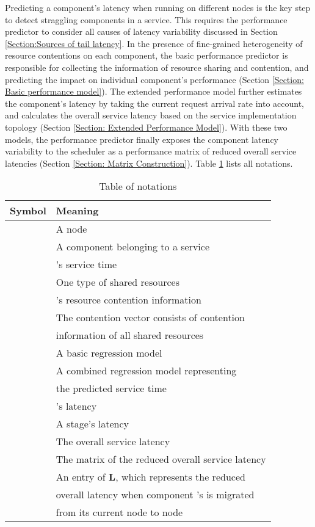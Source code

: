 \documentclass[10pt, conference, compsocconf]{IEEEtran}
\begin{document}
Predicting a component's latency when running on different nodes is the key step to detect straggling components in a service. This requires the performance predictor to consider all causes of latency variability discussed in Section \ref{Section:Sources of tail latency}. In the presence of fine-grained heterogeneity of resource contentions on each component, the basic performance predictor is responsible for collecting the information of resource sharing and contention, and predicting the impact on individual component's performance (Section \ref{Section: Basic performance model}). The extended performance model further estimates the component's latency by taking the current request arrival rate into account, and calculates the overall service latency based on the service implementation topology (Section \ref{Section: Extended Performance Model}). With these two models, the performance predictor finally exposes the component latency variability to the scheduler as a performance matrix of reduced overall service latencies (Section \ref{Section: Matrix Construction}). Table \ref{table: Table of notations} lists all notations.

\begin{table}[h!]
  \caption{Table of notations}
  \centering
  \begin{tabular}{|l|l|}
    \hline
    \textbf{Symbol} & \textbf{Meaning} \\
    \hline
     & A node \\
    \hline
     & A component belonging to a service\\
    \hline
     & 's service time \\
    \hline
     & One type of shared resources \\
    \hline
     & 's resource contention information \\
    \hline
     & The contention vector consists of contention \\
    &  information of all shared resources\\
    \hline
     & A basic regression model \\
    \hline
     & A combined regression model representing\\
    &the predicted service time\\
    \hline
     & 's latency \\
\hline
     & A stage's latency \\
    \hline
     & The overall service latency \\
    \hline
     & The matrix of the reduced overall service latency \\
    \hline
     & An entry of \textbf{L}, which represents the reduced \\
    & overall latency when component 's is migrated\\
    & from its current node to node  \\
    \hline
  \end{tabular}
  \label{table: Table of notations}
\end{table}
\end{document}
